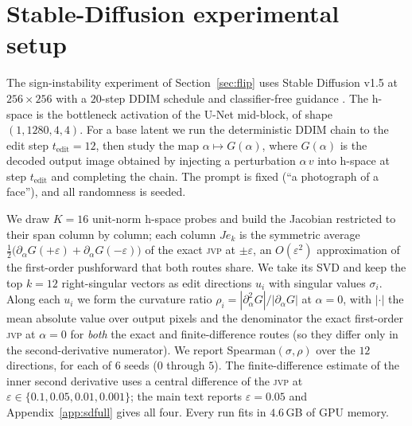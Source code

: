 \documentclass[10pt]{article} %
\newcommand{\jvp}{\textsc{jvp}}
\newcommand{\eps}{\varepsilon}
\begin{document}



\newpage
\appendix

\section{Stable-Diffusion experimental setup}
\label{app:sd}
The sign-instability experiment of Section~\ref{sec:flip} uses Stable Diffusion
v1.5 \citep{rombach2022} at $256{\times}256$ with a $20$-step DDIM schedule
\citep{song2021ddim} and classifier-free guidance \citep{ho2022cfg}. The h-space is
the bottleneck activation of the U-Net mid-block, of shape $(1,1280,4,4)$. For a
base latent we run the deterministic DDIM chain to the edit step
$t_{\mathrm{edit}}=12$, then study the map $\alpha\mapsto G(\alpha)$, where
$G(\alpha)$ is the decoded output image obtained by injecting a perturbation
$\alpha\,v$ into h-space at step $t_{\mathrm{edit}}$ and completing the chain. The
prompt is fixed (``a photograph of a face''), and all randomness is seeded.

We draw $K=16$ unit-norm h-space probes and build the Jacobian restricted to their
span column by column; each column $J e_k$ is the symmetric average
$\tfrac12\big(\partial_\alpha G(+\eps)+\partial_\alpha G(-\eps)\big)$ of the exact
\jvp{} at $\pm\eps$, an $O(\eps^2)$ approximation of the first-order pushforward
that both routes share. We take its SVD and keep the top $k=12$ right-singular
vectors as edit directions $u_i$ with singular values $\sigma_i$. Along each $u_i$
we form the curvature ratio $\rho_i=|\partial^2_\alpha G|/|\partial_\alpha G|$ at
$\alpha=0$, with $|\cdot|$ the mean absolute value over output pixels and the
denominator the exact first-order \jvp{} at $\alpha=0$ for \emph{both} the exact and
finite-difference routes (so they differ only in the second-derivative numerator).
We report Spearman$(\sigma,\rho)$ over the $12$ directions, for each of $6$ seeds
($0$ through $5$). The finite-difference estimate of the inner second derivative
uses a central difference of the \jvp{} at $\eps\in\{0.1,0.05,0.01,
0.001\}$; the main text reports $\eps=0.05$ and Appendix~\ref{app:sdfull} gives all
four. Every run fits in $4.6$\,GB of GPU memory.
\end{document}
